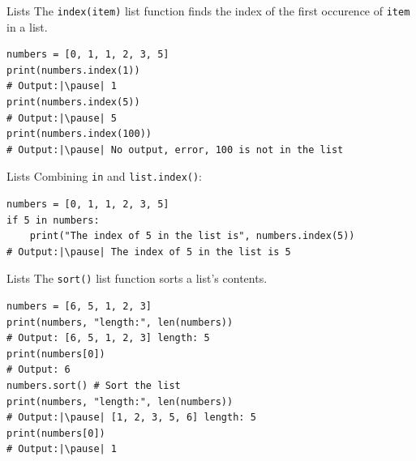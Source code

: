 \documentclass[dvipsnames, svgnames, x11names]{beamer}
\begin{document}
\begin{frame}[fragile]{Lists}
The \texttt{index(item)} list function finds the index of the first occurence of \texttt{item} in a list. \pause

\begin{verbatim}
numbers = [0, 1, 1, 2, 3, 5]
print(numbers.index(1)) 
# Output:|\pause| 1
print(numbers.index(5)) 
# Output:|\pause| 5
print(numbers.index(100))
# Output:|\pause| No output, error, 100 is not in the list
\end{verbatim}
\end{frame}

\begin{frame}[fragile]{Lists}
Combining \texttt{in} and \texttt{list.index()}: \pause

\begin{verbatim}
numbers = [0, 1, 1, 2, 3, 5]
if 5 in numbers:
    print("The index of 5 in the list is", numbers.index(5))
# Output:|\pause| The index of 5 in the list is 5
\end{verbatim}
\end{frame}

\begin{frame}[fragile]{Lists}
The \texttt{sort()} list function sorts a list's contents. \pause

\begin{verbatim}
numbers = [6, 5, 1, 2, 3]
print(numbers, "length:", len(numbers)) 
# Output: [6, 5, 1, 2, 3] length: 5
print(numbers[0])
# Output: 6
numbers.sort() # Sort the list
print(numbers, "length:", len(numbers)) 
# Output:|\pause| [1, 2, 3, 5, 6] length: 5
print(numbers[0])
# Output:|\pause| 1
\end{verbatim}
\end{frame}
\end{document}

